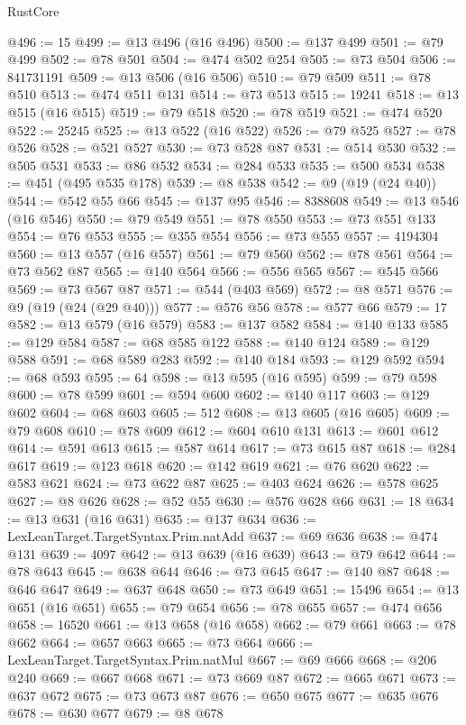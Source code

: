 \begin{lexlean}{RustCore}
\begin{coremodule}
@496 := 15
@499 := @13 @496 (@16 @496)
@500 := @137 @499
@501 := @79 @499
@502 := @78 @501
@504 := @474 @502 @254
@505 := @73 @504
@506 := 841731191
@509 := @13 @506 (@16 @506)
@510 := @79 @509
@511 := @78 @510
@513 := @474 @511 @131
@514 := @73 @513
@515 := 19241
@518 := @13 @515 (@16 @515)
@519 := @79 @518
@520 := @78 @519
@521 := @474 @520
@522 := 25245
@525 := @13 @522 (@16 @522)
@526 := @79 @525
@527 := @78 @526
@528 := @521 @527
@530 := @73 @528 @87
@531 := @514 @530
@532 := @505 @531
@533 := @86 @532
@534 := @284 @533
@535 := @500 @534
@538 := @451 (@495 @535 @178)
@539 := @8 @538
@542 := @9 (@19 (@24 @40))
@544 := @542 @55 @66
@545 := @137 @95
@546 := 8388608
@549 := @13 @546 (@16 @546)
@550 := @79 @549
@551 := @78 @550
@553 := @73 @551 @133
@554 := @76 @553
@555 := @355 @554
@556 := @73 @555
@557 := 4194304
@560 := @13 @557 (@16 @557)
@561 := @79 @560
@562 := @78 @561
@564 := @73 @562 @87
@565 := @140 @564
@566 := @556 @565
@567 := @545 @566
@569 := @73 @567 @87
@571 := @544 (@403 @569)
@572 := @8 @571
@576 := @9 (@19 (@24 (@29 @40)))
@577 := @576 @56
@578 := @577 @66
@579 := 17
@582 := @13 @579 (@16 @579)
@583 := @137 @582
@584 := @140 @133
@585 := @129 @584
@587 := @68 @585 @122
@588 := @140 @124
@589 := @129 @588
@591 := @68 @589 @283
@592 := @140 @184
@593 := @129 @592
@594 := @68 @593
@595 := 64
@598 := @13 @595 (@16 @595)
@599 := @79 @598
@600 := @78 @599
@601 := @594 @600
@602 := @140 @117
@603 := @129 @602
@604 := @68 @603
@605 := 512
@608 := @13 @605 (@16 @605)
@609 := @79 @608
@610 := @78 @609
@612 := @604 @610 @131
@613 := @601 @612
@614 := @591 @613
@615 := @587 @614
@617 := @73 @615 @87
@618 := @284 @617
@619 := @123 @618
@620 := @142 @619
@621 := @76 @620
@622 := @583 @621
@624 := @73 @622 @87
@625 := @403 @624
@626 := @578 @625
@627 := @8 @626
@628 := @52 @55
@630 := @576 @628 @66
@631 := 18
@634 := @13 @631 (@16 @631)
@635 := @137 @634
@636 := LexLeanTarget.TargetSyntax.Prim.natAdd
@637 := @69 @636
@638 := @474 @131
@639 := 4097
@642 := @13 @639 (@16 @639)
@643 := @79 @642
@644 := @78 @643
@645 := @638 @644
@646 := @73 @645
@647 := @140 @87
@648 := @646 @647
@649 := @637 @648
@650 := @73 @649
@651 := 15496
@654 := @13 @651 (@16 @651)
@655 := @79 @654
@656 := @78 @655
@657 := @474 @656
@658 := 16520
@661 := @13 @658 (@16 @658)
@662 := @79 @661
@663 := @78 @662
@664 := @657 @663
@665 := @73 @664
@666 := LexLeanTarget.TargetSyntax.Prim.natMul
@667 := @69 @666
@668 := @206 @240
@669 := @667 @668
@671 := @73 @669 @87
@672 := @665 @671
@673 := @637 @672
@675 := @73 @673 @87
@676 := @650 @675
@677 := @635 @676
@678 := @630 @677
@679 := @8 @678

\end{coremodule}
\end{lexlean}
